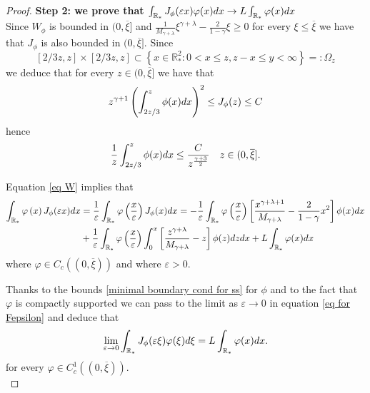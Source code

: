 \documentclass[11pt]{article}
\numberwithin{equation}{section}
\theoremstyle{plain}
\newcommand{\der}{\textup{d}}
\begin{document}
\begin{proof}
\textbf{Step 2: we prove that $\int_{\mathbb R_*} J_\phi(\varepsilon x) \varphi(x) \der x \rightarrow L  \int_{\mathbb R_*}\varphi(x) \der x$ }\\

Since $W_\phi$ is bounded  in $(0, \overline \xi ] $ and $\frac{1}{M_{\gamma+\lambda}} \xi^{\gamma+\lambda} -\frac{2}{1-\gamma} \xi \geq 0$ for every $\xi \leq \overline \xi$ we have that
 $J_\phi $ is also bounded in $(0, \overline \xi ] $.
Since 
\begin{equation} \label{Omega}
 [2/3 z , z ] \times [2/3 z , z ] \subset \left\{ x \in \mathbb R_*^2 : 0 <  x \leq z , z-x \leq  y < \infty    \right\}=:\Omega_z
\end{equation}
we deduce that for every $z \in (0, \overline \xi ] $ we have that
\[
z^{\gamma + 1 } \left( \int_{2z/3 }^z \phi(x) \der x \right)^2 \leq J_\phi(z) \leq C 
\] 
hence 
\begin{equation}\label{bound in mean}
\frac{1}{z}  \int_{2z/3}^z \phi(x) \der x \leq  \frac{C}{z^{\frac{\gamma + 3}{2} }} \quad z \in (0, \overline \xi ]. 
\end{equation} 

Equation \eqref{eq W} implies that 
\begin{align} \label{eq for Fepsilon}
\int_{\mathbb R_*} \varphi\left(x\right) J_{\phi}(\varepsilon x) \der x  & =\frac{1}{\varepsilon}\int_{\mathbb R_*} \varphi\left(\frac{x}{\varepsilon}\right) J_{\phi}( x) \der x = - \frac{1}{\varepsilon} \int_{\mathbb R_*} \varphi\left(\frac{x}{\varepsilon}\right) \left[ \frac{x^{\gamma+\lambda+1}}{M_{\gamma+\lambda}}- \frac{2}{1-\gamma}x^2\right] \phi(x) \der x \\
&  + \frac{1}{\varepsilon} \int_{\mathbb R_*} \varphi\left(\frac{x}{\varepsilon}\right) \int_0^x \left[ \frac{z^{\gamma+\lambda}}{M_{\gamma+\lambda}}- z\right] \phi(z) \der z  \der x  + L \int_{\mathbb R_*} \varphi(x) \der x \nonumber 
\end{align}
where $\varphi \in C_c((0, \overline \xi))$ and where $\varepsilon >0$. 

Thanks to the bounds \eqref{minimal boundary cond for ss} for $\phi$ and to the fact that $\varphi$ is compactly supported we can pass to the limit as $\varepsilon \rightarrow 0$ in equation \eqref{eq for Fepsilon} and deduce that 
\begin{align*}
\lim_{\varepsilon \rightarrow 0 } \int_{\mathbb R_*} J_{\phi}(\varepsilon \xi)  \varphi(\xi) \der \xi = L \int_{\mathbb R_*} \varphi(x) \der x.
\end{align*}
for every $\varphi \in C^1_c((0, \overline \xi))$. \\



\end{proof}
\end{document}
